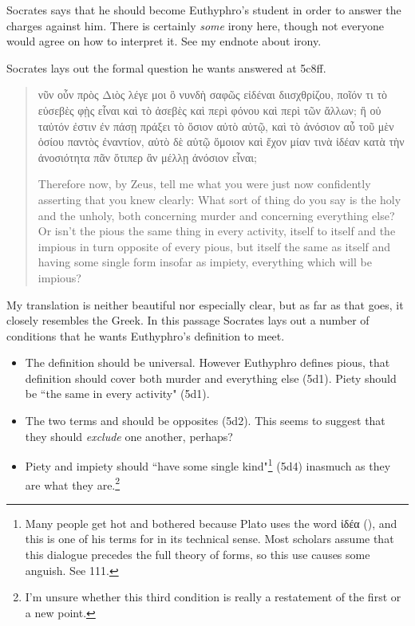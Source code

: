 \documentclass[11pt]{article}
\begin{document}
Socrates says that he should become Euthyphro's student in order to answer
the charges against him.  There is certainly \emph{some} irony here, though
not everyone would agree on how to interpret it.  See my endnote about
irony.

Socrates lays out the formal question he wants answered at 5c8ff.

\begin{quote}

    {\g
    νῦν οὖν πρὸς Διὸς λέγε μοι ὃ νυνδὴ σαφῶς εἰδέναι διισχθρίζου, ποῖόν τι
    τὸ εὐσεβὲς φῂς εἶναι καὶ τὸ ἀσεβὲς καὶ περὶ φόνου καὶ περὶ τῶν ἄλλων;
    ἢ οὐ ταὐτόν ἐστιν ἐν πάσῃ πράξει τὸ ὅσιον αὐτὸ αὑτῷ, καὶ τὸ ἀνόσιον αὖ
    τοῦ μὲν ὁσίου παντὸς ἐναντίον, αὐτὸ δὲ αὑτῷ ὅμοιον καὶ ἔχον μίαν τινὰ
    ἰδέαν κατὰ τὴν ἀνοσιότητα πᾶν ὅτιπερ ἂν μέλλῃ ἀνόσιον εἶναι;
    }

    Therefore now, by Zeus, tell me what you were just now confidently
    asserting that you knew clearly: What sort of thing do you say is the
    holy and the unholy, both concerning murder and concerning everything
    else? Or isn't the pious the same thing in every activity, itself to
    itself and the impious in turn opposite of every pious, but itself the
    same as itself and having some single form insofar as impiety,
    everything which will be impious?

\end{quote}

My translation is neither beautiful nor especially clear, but as far as
that goes, it closely resembles the Greek.  In this passage Socrates lays
out a number of conditions that he wants Euthyphro's definition to meet.

\begin{itemize}
    \item The definition should be universal.  However Euthyphro defines
        pious, that definition should cover both murder and everything else
        (5d1).  Piety should be ``the same in every activity" (5d1).
    \item The two terms  and  should be opposites
        (5d2).  This seems to suggest that they should \emph{exclude} one
        another, perhaps?
    \item Piety and impiety should ``have some single kind"\footnote{Many
        people get hot and bothered because Plato uses the word {\g ἰδέα}
        (), and this is one of his terms for  in
        its technical sense.  Most scholars assume that this dialogue
        precedes the full theory of forms, so this use causes some anguish.
        See \citet{burnet1924} 111.} (5d4) inasmuch as they are what they
        are.\footnote{I'm unsure whether this third condition is really a
        restatement of the first or a new point.}

\end{itemize}
\end{document}
